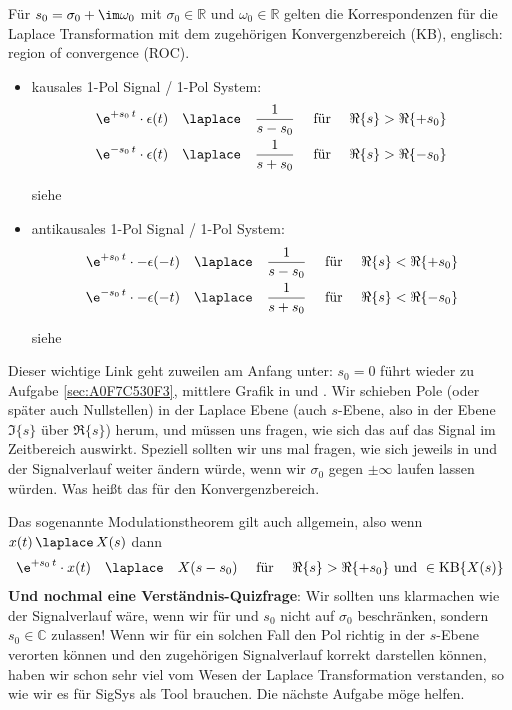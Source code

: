 \begin{Loesung}
%
Für $s_0=\sigma_0 + \im \omega_0$ mit $\sigma_0\in\mathbb{R}$ und $\omega_0\in\mathbb{R}$
gelten die Korrespondenzen für die Laplace Transformation mit dem zugehörigen
Konvergenzbereich (KB), englisch: region of convergence (ROC).
%
\begin{itemize}
  \item kausales 1-Pol Signal / 1-Pol System:
  \begin{align}
  \e^{+s_0 \, t} \cdot \epsilon(t) \quad \laplace \quad \frac{1}{s-s_0} \quad\text{ für } \quad\Re\{s\} > \Re\{+s_0\}\\
  \e^{-s_0 \, t} \cdot \epsilon(t) \quad \laplace \quad \frac{1}{s+s_0} \quad\text{ für } \quad\Re\{s\} > \Re\{-s_0\}
  \end{align}

  siehe 

  \item antikausales 1-Pol Signal / 1-Pol System:
  \begin{align}
  \e^{+s_0 \, t} \cdot -\epsilon(-t) \quad \laplace \quad \frac{1}{s-s_0} \quad\text{ für } \quad\Re\{s\} < \Re\{+s_0\}\\
  \e^{-s_0 \, t} \cdot -\epsilon(-t) \quad \laplace \quad \frac{1}{s+s_0} \quad\text{ für } \quad\Re\{s\} < \Re\{-s_0\}
  \end{align}

  siehe 

\end{itemize}
%
Dieser wichtige Link geht zuweilen am Anfang unter: $s_0=0$ führt wieder zu Aufgabe \ref{sec:A0F7C530F3},
mittlere Grafik in  und .
Wir schieben Pole (oder später auch Nullstellen) in der Laplace Ebene
(auch $s$-Ebene, also in der Ebene $\Im\{s\}$ über $\Re\{s\}$) herum,
und müssen uns fragen, wie sich das auf das Signal im Zeitbereich auswirkt.
%
Speziell sollten wir uns mal fragen, wie sich jeweils in
 und  der
Signalverlauf weiter ändern würde, wenn
wir $\sigma_0$ gegen $\pm\infty$ laufen lassen würden.
Was heißt das für den Konvergenzbereich.

Das sogenannte Modulationstheorem gilt auch allgemein, also wenn
$x(t) \,\laplace\, X(s)$
%
dann
\begin{align}
\e^{+s_0 \, t} \cdot x(t) \quad \laplace \quad X(s-s_0) \quad\text{ für } \quad\Re\{s\} > \Re\{+s_0\}\textrm{ und }\in\mathrm{KB}\{X(s)\}
\end{align}
%
\textbf{Und nochmal eine Verständnis-Quizfrage}:
Wir sollten uns klarmachen wie der Signalverlauf wäre, wenn wir
für  und 
$s_0$ nicht auf $\sigma_0$ beschränken, sondern $s_0\in\mathbb{C}$ zulassen!
Wenn wir für ein solchen Fall den Pol richtig in der $s$-Ebene verorten können
und den zugehörigen Signalverlauf korrekt darstellen können, haben wir
schon sehr viel vom Wesen der Laplace Transformation verstanden, so wie wir es
für SigSys als Tool brauchen.
%
Die nächste Aufgabe möge helfen.
\end{Loesung}

